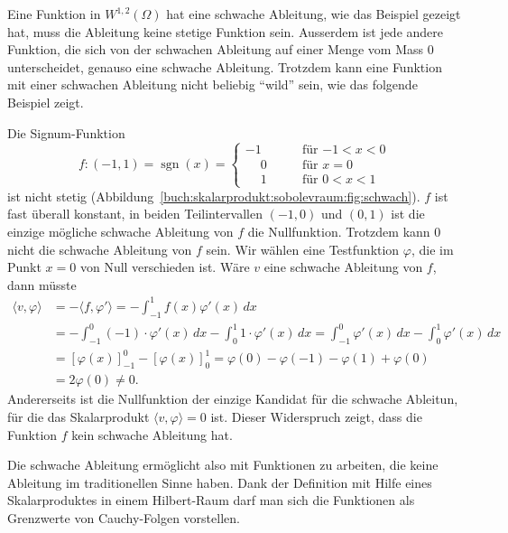 Eine Funktion in $W^{1,2}(\Omega)$ hat eine schwache Ableitung,
wie das Beispiel gezeigt hat, muss die Ableitung keine stetige
Funktion sein.
Ausserdem ist jede andere Funktion, die sich von der schwachen
Ableitung auf einer Menge vom Mass 0 unterscheidet, genauso eine
schwache Ableitung.
Trotzdem kann eine Funktion mit einer schwachen Ableitung nicht
beliebig ``wild'' sein, wie das folgende Beispiel zeigt.

\begin{beispiel}
\label{buch:skalarprodukt:sobolevraum:bsp:schwachexistiertnicht}
Die Signum-Funktion
\[
f\colon (-1,1) = \operatorname{sgn}(x) =
\begin{cases}
         - 1&\qquad\text{für $-1<x<0$}\\
\phantom{-}0&\qquad\text{für $x=0$}\\
\phantom{-}1&\qquad\text{für $0<x<1$}
\end{cases}
\]
ist nicht stetig (Abbildung~\ref{buch:skalarprodukt:sobolevraum:fig:schwach}).
$f$ ist fast überall konstant, in beiden Teilintervallen $(-1,0)$ und
$(0,1)$ ist die einzige mögliche schwache Ableitung von $f$ die
Nullfunktion.
Trotzdem kann $0$ nicht die schwache Ableitung von $f$ sein.
Wir wählen eine Testfunktion $\varphi$, die im Punkt $x=0$ von
Null verschieden ist.
Wäre $v$ eine schwache Ableitung von $f$, dann müsste
\begin{align*}
\langle v,\varphi\rangle
&=
-\langle f,\varphi'\rangle
=
-\int_{-1}^1 f(x) \varphi'(x)\,dx
\\
&=
-\int_{-1}^0 (-1)\cdot \varphi'(x)\,dx
-\int_{0}^1 1\cdot \varphi'(x)\,dx
=
\int_{-1}^0 \varphi'(x)\,dx
-
\int_{0}^1 \varphi'(x)\,dx
\\
&=
[\varphi(x)]_{-1}^0
-
[\varphi(x)]_{0}^1
=
\varphi(0)-\varphi(-1)
-
\varphi(1)+\varphi(0)
\\
&=
2\varphi(0)
\ne 0.
\end{align*}
Andererseits ist die Nullfunktion der einzige Kandidat für die
schwache Ableitun, für die das Skalarprodukt $\langle v,\varphi\rangle=0$
ist.
Dieser Widerspruch zeigt, dass die Funktion $f$ kein schwache
Ableitung hat.
\end{beispiel}

Die schwache Ableitung ermöglicht also mit Funktionen zu arbeiten,
die keine Ableitung im traditionellen Sinne haben.
Dank der Definition mit Hilfe eines Skalarproduktes in einem 
Hilbert-Raum darf man sich die Funktionen als Grenzwerte von
Cauchy-Folgen vorstellen.

%
%
